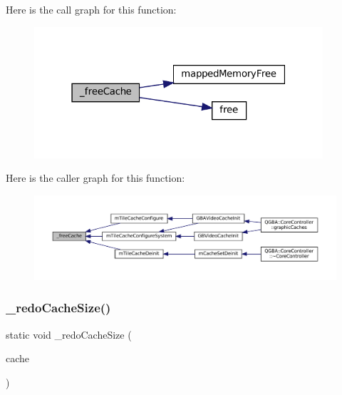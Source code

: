 Here is the call graph for this function\+:
\nopagebreak
\begin{figure}[H]
\begin{center}
\leavevmode
\includegraphics[width=304pt]{tile-cache_8c_a4f35746d84b7aef07507094ca898748f_cgraph}
\end{center}
\end{figure}
Here is the caller graph for this function\+:
\nopagebreak
\begin{figure}[H]
\begin{center}
\leavevmode
\includegraphics[width=350pt]{tile-cache_8c_a4f35746d84b7aef07507094ca898748f_icgraph}
\end{center}
\end{figure}
\mbox{\label{tile-cache_8c_a153de28ed2867a57b6de1dff09c616b2}} 
\subsubsection{\texorpdfstring{\+\_\+redo\+Cache\+Size()}{\_redoCacheSize()}}
{\footnotesize\ttfamily static void \+\_\+redo\+Cache\+Size (\begin{DoxyParamCaption}\item[{struct m\+Tile\+Cache $\ast$}]{cache }\end{DoxyParamCaption})\hspace{0.3cm}{\ttfamily [static]}}

